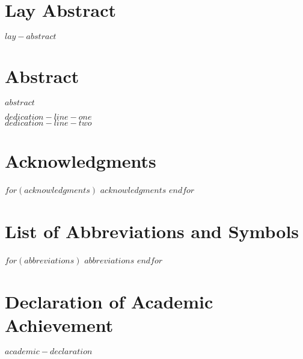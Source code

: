 \documentclass[
$if(fontsize)$
	$fontsize$,
$endif$
$if(lang)$
	$babel-lang$,
$endif$
$if(papersize)$
	$papersize$paper,
$endif$
$if(beamer)$
	ignorenonframetext,
$if(handout)$
	handout,
$endif$
$if(aspectratio)$
	aspectratio=$aspectratio$,
$endif$
$endif$
$for(classoption)$
	$classoption$$sep$,
$endfor$
]{$documentclass$}
\begin{document}
\chapter{Lay Abstract}
$lay-abstract$

\chapter{Abstract}
$abstract$

\newpage
\null\vfill
\begin{center}
\textsl{$dedication-line-one$ \\ $dedication-line-two$}
\end{center}
\vfill
	
\chapter{Acknowledgments}
$for(acknowledgments)$
  $acknowledgments$\newline
	\newline
$endfor$
\newpage

\tableofcontents

\newpage
\addvspace{10pt}
\let\saveaddvspace=\addvspace
\def\addvspace#1{}
\listoffigures
\let\addvspace=\saveaddvspace

\newpage
\addvspace{10pt}
\let\saveaddvspace=\addvspace
\def\addvspace#1{}
\listoftables
\let\addvspace=\saveaddvspace
\label{NumPrefacePages}
\newpage

\chapter{List of Abbreviations and Symbols}
$for(abbreviations)$
  $abbreviations$\newline
$endfor$
\newpage

\chapter{Declaration of Academic Achievement}
$academic-declaration$\newline
\end{document}
